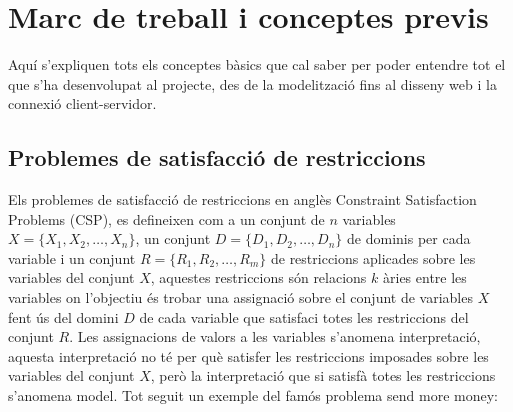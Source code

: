 


\chapter{Marc de treball i conceptes previs} %

\label{Marc de treball i conceptes previs} %

Aquí s'expliquen tots els conceptes bàsics que cal saber per poder entendre tot el que s'ha desenvolupat al projecte, des de la modelització fins al disseny web i la connexió client-servidor.
\section{Problemes de satisfacció de restriccions}
Els problemes de satisfacció de restriccions en anglès Constraint Satisfaction Problems (CSP), es defineixen com a un conjunt de $n$ variables \( X = \{X_1, X_2, \ldots, X_n\} \), un conjunt \( D = \{D_1, D_2, \ldots, D_n\} \) de dominis per cada variable i un conjunt \( R = \{R_1, R_2, \ldots, R_m\} \) de restriccions aplicades sobre les variables del conjunt $X$, aquestes restriccions són relacions $k$ àries entre les variables on l'objectiu és trobar una assignació sobre el conjunt de variables $X$ fent ús del domini $D$ de cada variable que satisfaci totes les restriccions del conjunt $R$. Les assignacions de valors a les variables s'anomena interpretació, aquesta interpretació no té per què satisfer les restriccions imposades sobre les variables del conjunt $X$, però la interpretació que si satisfà totes les restriccions s'anomena model. Tot seguit un exemple del famós problema send more money:\\

